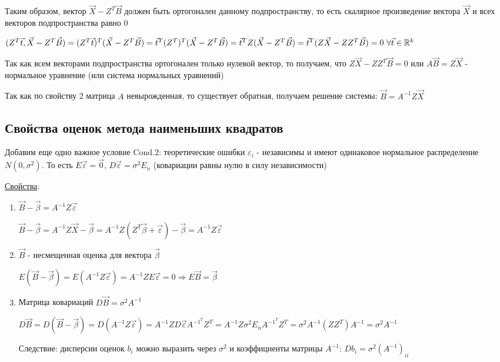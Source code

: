\documentclass[12pt]{article}
\begin{document}
Таким образом, вектор $\vec X - Z^T \vec B$ должен быть ортогонален данному подпространству, то есть скалярное произведение вектора $\vec X$ и всех векторов подпространства равно 0

$(Z^T \vec t, \vec X - Z^T \vec B) = (Z^T \vec t)^T (\vec X - Z^T \vec B) = {\vec t}^T (Z^T)^T (\vec X - Z^T \vec B) = {\vec t}^T Z (\vec X - Z^T \vec B) = 
{\vec t}^T (Z \vec X - Z Z ^T \vec B) = 0 \ \forall \vec t \in \mathbb{R}^k$

Так как всем векторами подпространства ортогонален только нулевой вектор, то получаем, что $Z \vec X - Z Z^T \vec B = 0$ или $A \vec B = Z \vec X$ - нормальное уравнение (или система нормальных уравнений)

Так как по свойству 2 матрица $A$ невырожденная, то существует обратная, получаем решение системы: $\vec B = A^{-1} Z \vec X$

\subsection{Свойства оценок метода наименьших квадратов}

Добавим еще одно важное условие $\mathrm{Cond. 2}$: теоретические ошибки $\varepsilon_i$ - независимы и имеют одинаковое нормальное распределение $N(0, \sigma^2)$.
То есть $E \vec \varepsilon = \vec 0$, $D \vec \varepsilon = \sigma^2 E_n$ (ковариации равны нулю в силу независимости)

\hypertarget{mls_evaluation_properties}{}

\underline{Свойства}:

\begin{enumerate}
    \item $\vec B - \vec \beta = A^{-1} Z \vec \varepsilon$

    \begin{MyProof}
        $\vec B - \vec \beta = A^{-1} Z \vec X - \vec \beta = A^{-1} Z (Z^T \vec \beta + \vec \varepsilon) - \vec \beta = A^{-1} Z \vec \varepsilon$
    \end{MyProof}

    \item $\vec B$ - несмещенная оценка для вектора $\vec \beta$

    \begin{MyProof}
        $E(\vec B - \vec \beta) = E(A^{-1} Z \vec \varepsilon) = A^{-1} Z E \vec \varepsilon = 0 \Longrightarrow E \vec B = \vec \beta$
    \end{MyProof}

    \item Матрица ковариаций $D \vec B = \sigma^2 A^{-1}$

    \begin{MyProof}
        $D \vec B = D (\vec B - \vec \beta) = D (A^{-1} Z \vec \varepsilon) = A^{-1} Z D \vec \varepsilon A^{-1}^T Z^T = A^{-1} Z \sigma^2 E_n A^{-1}^T Z^T = \sigma^2 A^{-1} (Z Z^T) A^{-1} = \sigma^2 A^{-1}$
    \end{MyProof}

    Следствие: дисперсии оценок $b_i$ можно выразить через $\sigma^2$ и коэффициенты матрицы $A^{-1}$: $D b_i = \sigma^2 (A^{-1})_{ii}$

\end{enumerate}
\end{document}
